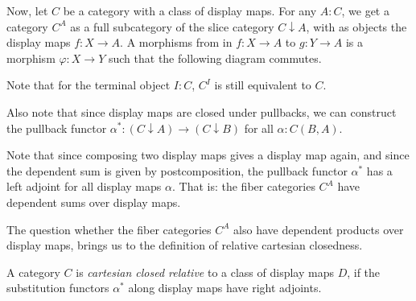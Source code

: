 Now, let $ C $ be a category with a class of display maps. For any $ A : C $, we get a category $ C^A $ as a full subcategory of the slice category $ C \downarrow A $, with as objects the display maps $ f: X \to A $. A morphisms from in $ f: X \to A $ to $ g: Y \to A $ is a morphism $ \varphi: X \to Y $ such that the following diagram commutes.
\begin{center}
\end{center}
Note that for the terminal object $ I : C $, $ C^I $ is still equivalent to $ C $.

Also note that since display maps are closed under pullbacks, we can construct the pullback functor $ \alpha^*: (C \downarrow A) \to (C \downarrow B) $ for all $ \alpha: C(B, A) $.

Note that since composing two display maps gives a display map again, and since the dependent sum is given by postcomposition, the pullback functor $ \alpha^* $ has a left adjoint for all display maps $ \alpha $. That is: the fiber categories $ C^A $ have dependent sums over display maps.

The question whether the fiber categories $ C^A $ also have dependent products over display maps, brings us to the definition of relative cartesian closedness.
\begin{definition}
  A category $ C $ is \textit{cartesian closed relative} to a class of display maps $ D $, if the substitution functors $ \alpha^* $ along display maps have right adjoints.
\end{definition}
